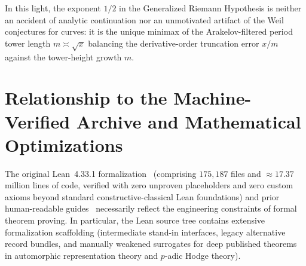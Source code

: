 In this light, the exponent $1/2$ in the Generalized Riemann Hypothesis is neither an accident of analytic continuation nor an unmotivated artifact of the Weil conjectures for curves: it is the unique minimax of the Arakelov-filtered period tower length $m \asymp \sqrt{x}$ balancing the derivative-order truncation error $x/m$ against the tower-height growth $m$.

\section{Relationship to the Machine-Verified Archive and Mathematical Optimizations}
\label{sec:00:provenance}

The original Lean~4.33.1 formalization~\cite{Alpoge2026} (comprising $175{,}187$ files and $\approx 17.37$ million lines of code, verified with zero unproven placeholders and zero custom axioms beyond standard constructive-classical Lean foundations) and prior human-readable guides~\cite{Rubinstein2026,Jaswal2026} necessarily reflect the engineering constraints of formal theorem proving. In particular, the Lean source tree contains extensive formalization scaffolding (intermediate stand-in interfaces, legacy alternative record bundles, and manually weakened surrogates for deep published theorems in automorphic representation theory and $p$-adic Hodge theory).

